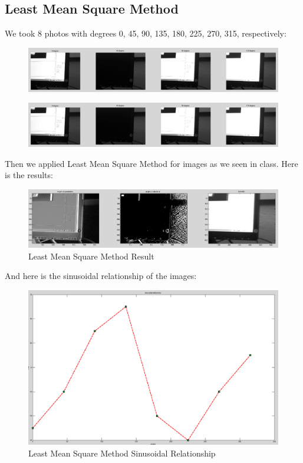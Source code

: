 \documentclass{article}
\begin{document}
	\subsection{Least Mean Square Method}
	We took 8 photos with degrees 0, 45, 90, 135, 180, 225, 270, 315, respectively:
	\begin{figure}[H]
	\centering
	\includegraphics[scale=0.33]{LMSM1.png}
	\end{figure}
	\begin{figure}[H]
	\centering
	\includegraphics[scale=0.33]{LMSM1.png}
	\end{figure}
	
	Then we applied Least Mean Square Method for images as we seen in class. Here is the results:
	\begin{figure}[H]
	\centering
	\includegraphics[scale=0.33]{LMSMResult.png}
	\caption{Least Mean Square Method Result}
	\end{figure}
	
	And here is the sinusoidal relationship of the images:
	\begin{figure}[H]
	\centering
	\includegraphics[scale=0.3]{LMSMSinusoidalRelationship.png}
	\caption{Least Mean Square Method Sinusoidal Relationship}
	\end{figure}
	
\end{document}
